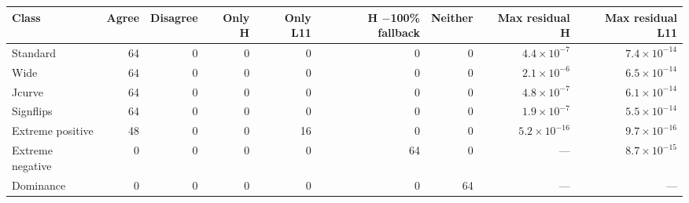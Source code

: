 \begin{tabular}{lrrrrrrrr}
\toprule
Class & Agree & Disagree & Only H & Only L11 & H $-$100\% fallback & Neither & Max residual H & Max residual L11 \\
\midrule
Standard & 64 & 0 & 0 & 0 & 0 & 0 & $4.4\times10^{-7}$ & $7.4\times10^{-14}$ \\
Wide & 64 & 0 & 0 & 0 & 0 & 0 & $2.1\times10^{-6}$ & $6.5\times10^{-14}$ \\
Jcurve & 64 & 0 & 0 & 0 & 0 & 0 & $4.8\times10^{-7}$ & $6.1\times10^{-14}$ \\
Signflips & 64 & 0 & 0 & 0 & 0 & 0 & $1.9\times10^{-7}$ & $5.5\times10^{-14}$ \\
Extreme positive & 48 & 0 & 0 & 16 & 0 & 0 & $5.2\times10^{-16}$ & $9.7\times10^{-16}$ \\
Extreme negative & 0 & 0 & 0 & 0 & 64 & 0 & --- & $8.7\times10^{-15}$ \\
Dominance & 0 & 0 & 0 & 0 & 0 & 64 & --- & --- \\
\bottomrule
\end{tabular}

